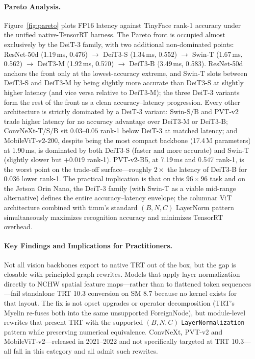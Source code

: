 \documentclass[runningheads,a4paper]{llncs}
\begin{document}
\paragraph{Pareto Analysis.}
Figure~\ref{fig:pareto} plots FP16 latency against TinyFace rank-1 accuracy under the unified native-TensorRT harness. The Pareto front is occupied almost exclusively by the DeiT-3 family, with two additional non-dominated points: ResNet-50d (1.19\,ms, 0.476) $\to$ DeiT3-S (1.34\,ms, 0.552) $\to$ Swin-T (1.67\,ms, 0.562) $\to$ DeiT3-M (1.92\,ms, 0.570) $\to$ DeiT3-B (3.49\,ms, 0.583). ResNet-50d anchors the front only at the lowest-accuracy extreme, and Swin-T slots between DeiT3-S and DeiT3-M by being slightly more accurate than DeiT3-S at slightly higher latency (and vice versa relative to DeiT3-M); the three DeiT-3 variants form the rest of the front as a clean accuracy--latency progression. Every other architecture is strictly dominated by a DeiT-3 variant: Swin-S/B and PVT-v2 trade higher latency for no accuracy advantage over DeiT3-M or DeiT3-B; ConvNeXt-T/S/B sit $0.03$--$0.05$ rank-1 below DeiT-3 at matched latency; and MobileViT-v2-200, despite being the most compact backbone (17.4\,M parameters) at 1.90\,ms, is dominated by both DeiT3-S (faster and more accurate) and Swin-T (slightly slower but $+0.019$ rank-1). PVT-v2-B5, at 7.19\,ms and 0.547 rank-1, is the worst point on the trade-off surface---roughly $2\times$ the latency of DeiT3-B for $0.036$ lower rank-1. The practical implication is that on this $96\times96$ task and on the Jetson Orin Nano, the DeiT-3 family (with Swin-T as a viable mid-range alternative) defines the entire accuracy--latency envelope; the columnar ViT architecture combined with timm's standard $(B,N,C)$ LayerNorm pattern simultaneously maximizes recognition accuracy and minimizes TensorRT overhead.

\paragraph{Key Findings and Implications for Practitioners.}

Not all vision backbones export to native TRT out of the box, but the gap is closable with principled graph rewrites. Models that apply layer normalization directly to NCHW spatial feature maps---rather than to flattened token sequences---fail standalone TRT 10.3 conversion on SM 8.7 because no kernel exists for that layout. The fix is not opset upgrades or operator decomposition (TRT's Myelin re-fuses both into the same unsupported ForeignNode), but module-level rewrites that present TRT with the supported $(B,N,C)$ \texttt{LayerNormalization} pattern while preserving numerical equivalence. ConvNeXt, PVT-v2 and MobileViT-v2---released in 2021--2022 and not specifically targeted at TRT 10.3---all fall in this category and all admit such rewrites.
\end{document}

